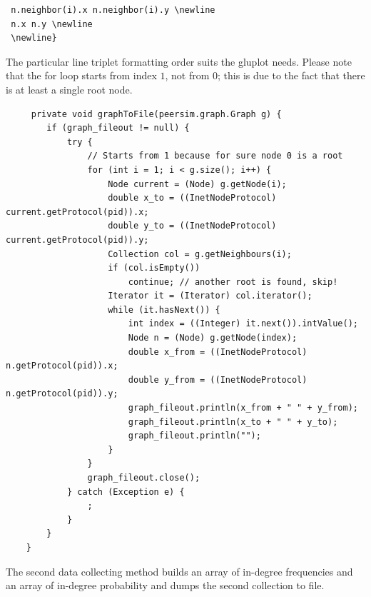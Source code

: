 \documentclass[a4paper,12pt]{article}
\begin{document}
\footnotesize
\begin{verbatim}
 n.neighbor(i).x n.neighbor(i).y \newline
 n.x n.y \newline
 \newline}
\end{verbatim}
\normalsize 

The particular line triplet formatting order suits the gluplot needs. 
Please note that the for loop starts from index $1$, not from $0$;
this is due to the fact that there is at least a single root node. 


\footnotesize
\begin{verbatim}
     private void graphToFile(peersim.graph.Graph g) {
        if (graph_fileout != null) {
            try {
                // Starts from 1 because for sure node 0 is a root
                for (int i = 1; i < g.size(); i++) {
                    Node current = (Node) g.getNode(i);
                    double x_to = ((InetNodeProtocol) current.getProtocol(pid)).x;
                    double y_to = ((InetNodeProtocol) current.getProtocol(pid)).y;
                    Collection col = g.getNeighbours(i);
                    if (col.isEmpty())
                        continue; // another root is found, skip!
                    Iterator it = (Iterator) col.iterator();
                    while (it.hasNext()) {
                        int index = ((Integer) it.next()).intValue();
                        Node n = (Node) g.getNode(index);
                        double x_from = ((InetNodeProtocol) n.getProtocol(pid)).x;
                        double y_from = ((InetNodeProtocol) n.getProtocol(pid)).y;
                        graph_fileout.println(x_from + " " + y_from);
                        graph_fileout.println(x_to + " " + y_to);
                        graph_fileout.println("");
                    }
                }
                graph_fileout.close();
            } catch (Exception e) {
                ;
            }
        }
    }
\end{verbatim}
\normalsize

The second data collecting method builds an array of in-degree frequencies 
and an array of in-degree probability and dumps the second collection to file.
\end{document}
